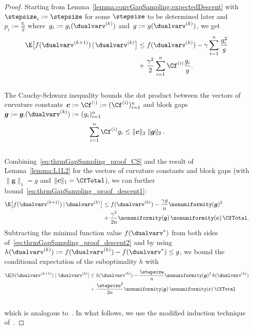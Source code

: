 \documentclass{article}
\begin{document}
\begin{proof}
    Starting from Lemma~\ref{lemma:convGapSampling:expectedDescent} with $\stepsize_i:=\stepsize$ for some $\stepsize$ to be determined later and $p_i := \frac{g_i}{g}$ where~$g_i:=g_i(\dualvarv^{(k)})$ and~$g:=g(\dualvarv^{(k)})$, we get\\[-0.4cm]
    \begin{align}  
    \notag
    \E\big[ f(\dualvarv^{(k+1)})\,|\, \dualvarv^{(k)}\big]
    &\le f(\dualvarv^{(k)}) -  \gamma \sum_{i=1}^n \frac{g_i^2}{ g } \\[-0.1cm]
    \label{eq:thrmGapSampling_proof_descent1}
    & + \frac{\gamma^2}{2}\sum_{i=1}^n  \Cf^{(i)} \frac{g_i}{ g }.
    \end{align}\\[-0.3cm]
    The Cauchy-Schwarz inequality bounds the dot product between the vectors of curvature constants~$\bm{c} := \Cf^{(:)} := (\Cf^{(i)})_{i=1}^n$ and block gaps~$\bm{g}:= \bm{g}_{:}(\dualvarv^{(k)}) :=(g_i)_{i=1}^n$\\[-0.3cm]
    \begin{equation}
    \label{eq:thrmGapSampling_proof_CS}
    \sum_{i=1}^n  \Cf^{(i)} g_i
    \leq 
    \| \bm{c} \|_2 \;  \| \bm{g} \|_2 \,.
    \end{equation}\\[-0.2cm]
    Combining~\eqref{eq:thrmGapSampling_proof_CS} and the result of Lemma~\ref{lemma:L1L2} for the vectors of curvature constants and block gaps (with $\| \bm{g} \|_1 = g$ and $\| \bm{c} \|_1 = \CfTotal$), we can further bound~\eqref{eq:thrmGapSampling_proof_descent1}: 
    \begin{align}  
    \notag
    \E\big[ f(\dualvarv^{(k+1)})\,|\, \dualvarv^{(k)}\big]
    &\le f(\dualvarv^{(k)}) -  \frac{\gamma g}{n} \nonuniformity( \bm{g} )^2 \\[-0.1cm]
    \label{eq:thrmGapSampling_proof_descent2}
    & + \frac{\gamma^2}{2n} \nonuniformity( \bm{g} ) \, \nonuniformity( \bm{c} ) \, \CfTotal.
    \end{align}
    Subtracting the minimal function value $f(\dualvarv^*)$ from both sides of~\eqref{eq:thrmGapSampling_proof_descent2} and by using 
    $
    h(\dualvarv^{(k)}) := f(\dualvarv^{(k)}) - f(\dualvarv^*) \leq g
    $,
    we bound the conditional expectation of the suboptimality $h$ with\\[-0.4cm]
    \begin{align}
    \notag \E [ h(\dualvarv^{(k+1)}) \mid \dualvarv^{(k)}] 
    \le\;& 
    h(\dualvarv^{(k)}) - \frac{\stepsize}{n} \nonuniformity( \bm{g} )^2\, h(\dualvarv^{(k)}) 
    \\
    \label{eq:thrmGapSampling_proof_descent3}
    +\;&
    \frac{\stepsize^2}{2n} \nonuniformity( \bm{g} ) \, \nonuniformity( \bm{c} ) \,\CfTotal 
    \end{align}\\[-0.3cm]
    which is analogous to~\citep[Eq.~(20)]{lacosteJulien13bcfw}.
    In what follows, we use the modified induction technique of~\citep[Proof of Theorem~C.1]{lacosteJulien13bcfw}.
    

\end{proof}
\end{document}

